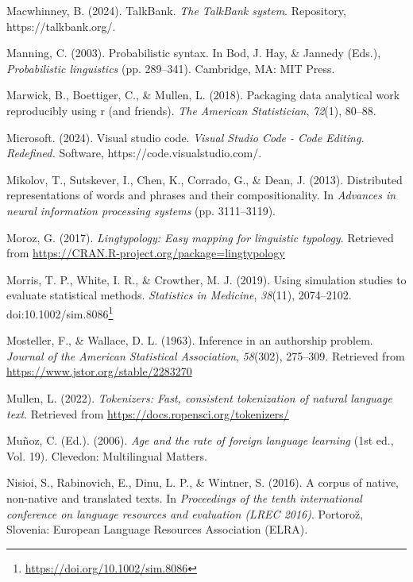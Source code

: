 \documentclass[
  letterpaper,
]{book}
\newlength{\cslhangindent}
\newenvironment{CSLReferences}[2] %
 {\begin{list}{}{%
  \setlength{\itemindent}{0pt}
  \setlength{\leftmargin}{0pt}
  \setlength{\parsep}{0pt}
  \ifodd #1
   \setlength{\leftmargin}{\cslhangindent}
   \setlength{\itemindent}{-1\cslhangindent}
  \fi
  \setlength{\itemsep}{#2\baselineskip}}}
 {\end{list}}
\theoremstyle{definition}
\theoremstyle{remark}
\DeclareRobustCommand{\href}[2]{#2\footnote{\url{#1}}}
\begin{document}
\begin{CSLReferences}{1}{0}
Macwhinney, B. (2024). TalkBank. \emph{The TalkBank system}. Repository,
https://talkbank.org/.

Manning, C. (2003). Probabilistic syntax. In Bod, J. Hay, \& Jannedy
(Eds.), \emph{Probabilistic linguistics} (pp. 289--341). Cambridge, MA:
MIT Press.

Marwick, B., Boettiger, C., \& Mullen, L. (2018). Packaging data
analytical work reproducibly using r (and friends). \emph{The American
Statistician}, \emph{72}(1), 80--88.

Microsoft. (2024). Visual studio code. \emph{Visual Studio Code - Code
Editing. Redefined.} Software, https://code.visualstudio.com/.

Mikolov, T., Sutskever, I., Chen, K., Corrado, G., \& Dean, J. (2013).
Distributed representations of words and phrases and their
compositionality. In \emph{Advances in neural information processing
systems} (pp. 3111--3119).

Moroz, G. (2017). \emph{Lingtypology: Easy mapping for linguistic
typology}. Retrieved from
\url{https://CRAN.R-project.org/package=lingtypology}

Morris, T. P., White, I. R., \& Crowther, M. J. (2019). Using simulation
studies to evaluate statistical methods. \emph{Statistics in Medicine},
\emph{38}(11), 2074--2102.
doi:\href{https://doi.org/10.1002/sim.8086}{10.1002/sim.8086}

Mosteller, F., \& Wallace, D. L. (1963). Inference in an authorship
problem. \emph{Journal of the American Statistical Association},
\emph{58}(302), 275--309. Retrieved from
\url{https://www.jstor.org/stable/2283270}

Mullen, L. (2022). \emph{Tokenizers: Fast, consistent tokenization of
natural language text}. Retrieved from
\url{https://docs.ropensci.org/tokenizers/}

Muñoz, C. (Ed.). (2006). \emph{Age and the rate of foreign language
learning} (1st ed., Vol. 19). Clevedon: Multilingual Matters.

Nisioi, S., Rabinovich, E., Dinu, L. P., \& Wintner, S. (2016). A corpus
of native, non-native and translated texts. In \emph{Proceedings of the
tenth international conference on language resources and evaluation
(LREC 2016)}. Portoro{z̆}, Slovenia: European Language Resources
Association (ELRA).


\end{CSLReferences}
\end{document}
